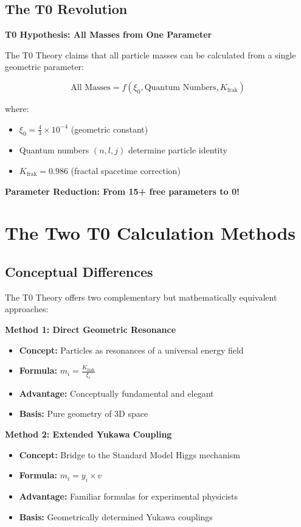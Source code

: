 \documentclass[12pt,a4paper]{article}
\begin{document}
	\subsection{The T0 Revolution}
	
	\begin{keyresult}
		\textbf{T0 Hypothesis: All Masses from One Parameter}
		
		The T0 Theory claims that all particle masses can be calculated from a single geometric parameter:
		
		\begin{equation}
			\boxed{\text{All Masses} = f(\xi_0, \text{Quantum Numbers}, K_{\text{frak}})}
		\end{equation}
		
		where:
		\begin{itemize}
			\item $\xi_0 = \frac{4}{3} \times 10^{-4}$ (geometric constant)
			\item Quantum numbers $(n,l,j)$ determine particle identity
			\item $K_{\text{frak}} = 0.986$ (fractal spacetime correction)
		\end{itemize}
		
		\textbf{Parameter Reduction: From 15+ free parameters to 0!}
	\end{keyresult}
	
	\section{The Two T0 Calculation Methods}
	
	\subsection{Conceptual Differences}
	
	The T0 Theory offers two complementary but mathematically equivalent approaches:
	
	\begin{method}
		\textbf{Method 1: Direct Geometric Resonance}
		\begin{itemize}
			\item \textbf{Concept:} Particles as resonances of a universal energy field
			\item \textbf{Formula:} $m_i = \frac{K_{\text{frak}}}{\xi_i}$
			\item \textbf{Advantage:} Conceptually fundamental and elegant
			\item \textbf{Basis:} Pure geometry of 3D space
		\end{itemize}
		
		\textbf{Method 2: Extended Yukawa Coupling}
		\begin{itemize}
			\item \textbf{Concept:} Bridge to the Standard Model Higgs mechanism
			\item \textbf{Formula:} $m_i = y_i \times v$
			\item \textbf{Advantage:} Familiar formulas for experimental physicists
			\item \textbf{Basis:} Geometrically determined Yukawa couplings
		\end{itemize}
	\end{method}
	
\end{document}
